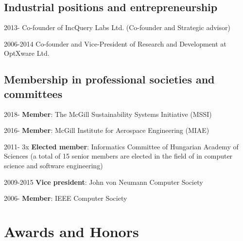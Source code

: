 \subsection{Industrial positions and entrepreneurship} 
\begin{yearlist}
\item[2013-] Co-founder of IncQuery Labs Ltd. (Co-founder and Strategic advisor) 
\item[2006-2014] Co-founder and Vice-President of Research and Development at OptXware Ltd. 
\end{yearlist}

\subsection{Membership in professional societies and committees}
\begin{yearlist}
\item[2018-] \textbf{Member}: The McGill Sustainability Systems Initiative (MSSI)
\item[2016-] \textbf{Member}: McGill Institute for Aerospace Engineering (MIAE)
\item[2011-] 3x \textbf{Elected member}: Informatics Committee of Hungarian Academy of Sciences (a total of 15 senior members are elected in the field of in computer science and software engineering)
\item[2009-2015] \textbf{Vice president}: John von Neumann Computer Society 
\item[2006-] \textbf{Member}: IEEE Computer Society 
\end{yearlist}


\section{Awards and Honors} 

